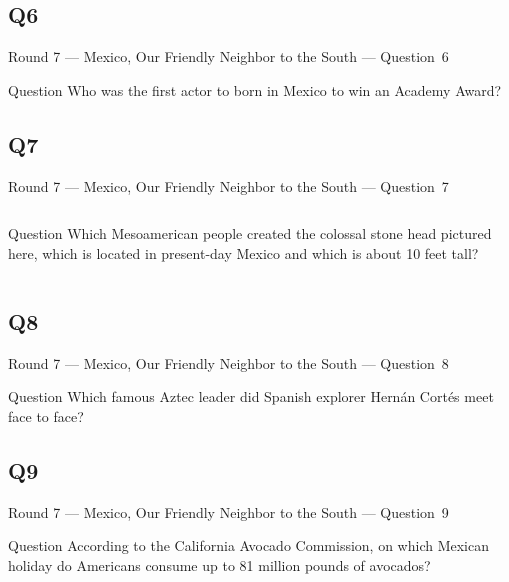 \documentclass[11pt]{beamer}
\begin{document}
\subsection*{Q6}
\begin{frame}[t]{Round 7 --- Mexico, Our Friendly Neighbor to the South --- \mbox{Question 6}}
\vspace{-0.5em}
\begin{block}{Question}
Who was the first actor to born in Mexico to win an Academy Award?
\end{block}
\end{frame}
\subsection*{Q7}
\begin{frame}[t]{Round 7 --- Mexico, Our Friendly Neighbor to the South --- \mbox{Question 7}}
\vspace{-0.5em}
\begin{columns}[T,totalwidth=\linewidth]
\begin{column}{0.32\linewidth}
\begin{block}{Question}
Which Mesoamerican people created the colossal stone head pictured here, which is located in present-day Mexico and which is about 10 feet tall?
\end{block}
\end{column}
\begin{column}{0.65\linewidth}
\begin{center}
\texttt{[image: \{Images/olmechead]}.jpg}
\end{center}
\end{column}
\end{columns}
\end{frame}
\subsection*{Q8}
\begin{frame}[t]{Round 7 --- Mexico, Our Friendly Neighbor to the South --- \mbox{Question 8}}
\vspace{-0.5em}
\begin{block}{Question}
Which famous Aztec leader did Spanish explorer Hernán Cortés meet face to face?
\end{block}
\end{frame}
\subsection*{Q9}
\begin{frame}[t]{Round 7 --- Mexico, Our Friendly Neighbor to the South --- \mbox{Question 9}}
\vspace{-0.5em}
\begin{block}{Question}
According to the California Avocado Commission, on which Mexican holiday do Americans consume up to 81 million pounds of  avocados?
\end{block}
\end{frame}
\end{document}
